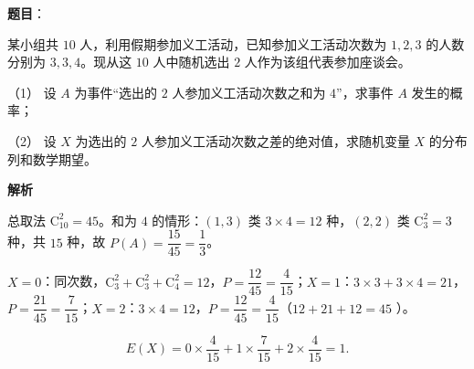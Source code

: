 \begin{answer}

\textbf{题目}：

某小组共 \(10\) 人，利用假期参加义工活动，已知参加义工活动次数为 \(1,2,3\) 的人数分别为 \(3,3,4\)。现从这 \(10\) 人中随机选出 \(2\) 人作为该组代表参加座谈会。

（1） 设 \(A\) 为事件“选出的 \(2\) 人参加义工活动次数之和为 \(4\)”，求事件 \(A\) 发生的概率；

（2） 设 \(X\) 为选出的 \(2\) 人参加义工活动次数之差的绝对值，求随机变量 \(X\) 的分布列和数学期望。

\textbf{解析}


总取法 \(\mathrm C_{10}^{2}=45\)。和为 \(4\) 的情形：\((1,3)\) 类 \(3\times4=12\) 种，\((2,2)\) 类 \(\mathrm C_{3}^{2}=3\) 种，共 \(15\) 种，故 \(P(A)=\dfrac{15}{45}=\dfrac{1}{3}\)。


\(X=0\)：同次数，\(\mathrm C_{3}^{2}+\mathrm C_{3}^{2}+\mathrm C_{4}^{2}=12\)，\(P=\dfrac{12}{45}=\dfrac{4}{15}\)；\(X=1\)：\(3\times3+3\times4=21\)，\(P=\dfrac{21}{45}=\dfrac{7}{15}\)；\(X=2\)：\(3\times4=12\)，\(P=\dfrac{12}{45}=\dfrac{4}{15}\)（\(12+21+12=45\) ）。

\nopagebreak[4]
\[
E(X)=0\times\frac{4}{15}+1\times\frac{7}{15}+2\times\frac{4}{15}=1.
\]



\end{answer}
